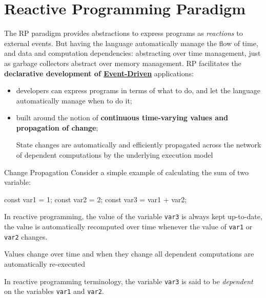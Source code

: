 \section{Reactive Programming Paradigm}\label{sec:rp_reactive_programming_paradigm} %
The RP paradigm provides abstractions to express programs as \textit{reactions} to external events.
But having the language automatically manage the flow of time, and data and computation dependencies: abstracting over time management, just as garbage collectors abstract over memory management.
\emptyln{}
RP facilitates the \textbf{declarative development of \hyperref[sec:rs_event_driven_programming]{Event-Driven}} applications:
\begin{itemize}
    \item developers can express programs in terms of what to do, and let the language automatically manage when to do it;
    \item built around the notion of \textbf{continuous time-varying values and propagation of change};
        \begin{note}
            State changes are automatically and efficiently propagated across the network of dependent computations by the underlying execution model
        \end{note}
\end{itemize}
\begin{example}{Change Propagation}{}
    Consider a simple example of calculating the sum of two variable:
    \begin{codeblock}[js]{}
    const var1 = 1;
    const var2 = 2;
    const var3 = var1 + var2;
    \end{codeblock}
    In reactive programming, the value of the variable \texttt{var3} is always kept up-to-date, the value is automatically recomputed over time whenever the value of \texttt{var1} or \texttt{var2} changes.
    \begin{note}
        Values change over time and when they change all dependent computations are automatically re-executed
    \end{note}
    In reactive programming terminology, the variable \texttt{var3} is said to be \textit{dependent} on the variables \texttt{var1} and \texttt{var2}.
\end{example}
%
